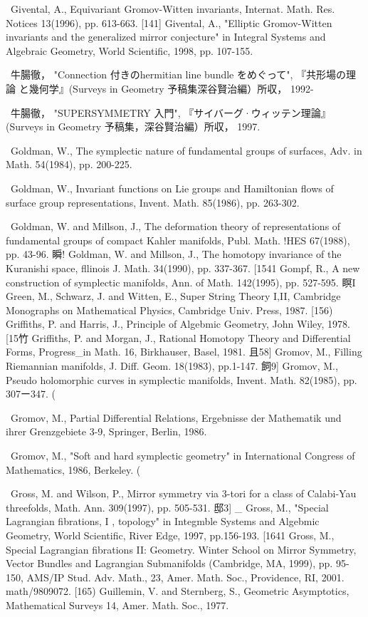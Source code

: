 {\noindent [146]\ Givental, A., Equivariant Gromov-Witten invariants, Internat. Math. Res. Notices 13(1996), pp. 613-663. [141] Givental, A., "Elliptic Gromov-Witten invariants and the generalized mirror conjecture" in Integral Systems and Algebraic Geometry, World Scientific, 1998, pp. 107-155.\par\smallskip
\noindent [148]\ 牛腸徹， "Connection 付きのhermitian line bundle をめぐって", 『共形場の理論 と幾何学』(Surveys in Geometry 予稿集深谷賢治編）所収， 1992-\par\smallskip
\noindent [149]\ 牛腸徹， "SUPERSYMMETRY 入門", 『サイバーグ·ウィッテン理論』(Surveys in Geometry 予稿集，深谷賢治編）所収， 1997.\par\smallskip
\noindent [150]\ Goldman, W., The symplectic nature of fundamental groups of surfaces, Adv. in Math. 54(1984), pp. 200-225.\par\smallskip
\noindent [151]\ Goldman, W., Invariant functions on Lie groups and Hamiltonian flows of surface group representations, Invent. Math. 85(1986), pp. 263-302.\par\smallskip
\noindent [152]\ Goldman, W. and Millson, J., The deformation theory of representations of fundamental groups of compact Kahler manifolds, Publ. Math. !HES 67(1988), pp. 43-96. 瞬! Goldman, W. and Millson, J., The homotopy invariance of the Kuranishi space, fllinois J. Math. 34(1990), pp. 337-367. [1541 Gompf, R., A new construction of symplectic manifolds, Ann. of Math. 142(1995), pp. 527-595. 瞑I Green, M., Schwarz, J. and Witten, E., Super String Theory I,II, Cambridge Monographs on Mathematical Physics, Cambridge Univ. Press, 1987. [156) Griffiths, P. and Harris, J., Principle of Algebmic Geometry, John Wiley, 1978. [15竹 Griffiths, P. and Morgan, J., Rational Homotopy Theory and Differential Forms, Progress\_in Math. 16, Birkhauser, Basel, 1981. 且58] Gromov, M., Filling Riemannian manifolds, J. Diff. Geom. 18(1983), pp.1-147. 飼9] Gromov, M., Pseudo holomorphic curves in symplectic manifolds, Invent. Math. 82(1985), pp. 307ー347. (\par\smallskip
\noindent [160]\ Gromov, M., Partial Differential Relations, Ergebnisse der Mathematik und ihrer Grenzgebiete 3-9, Springer, Berlin, 1986.\par\smallskip
\noindent [161]\ Gromov, M., "Soft and hard symplectic geometry" in International Congress of Mathematics, 1986, Berkeley. (\par\smallskip
\noindent [162]\ Gross, M. and Wilson, P., Mirror symmetry via 3-tori for a class of Calabi-Yau threefolds, Math. Ann. 309(1997), pp. 505-531. 邸3] \_ Gross, M., "Special Lagrangian fibrations, I , topology" in Integmble Systems and Algebmic Geometry, World Scientific, River Edge, 1997, pp.156-193. [1641 Gross, M., Special Lagrangian fibrations II: Geometry. Winter School on Mirror Symmetry, Vector Bundles and Lagrangian Submanifolds (Cambridge, MA, 1999), pp. 95-150, AMS/IP Stud. Adv. Math., 23, Amer. Math. Soc., Providence, RI, 2001. math/9809072. [165) Guillemin, V. and Sternberg, S., Geometric Asymptotics, Mathematical Surveys 14, Amer. Math. Soc., 1977.\par\smallskip
}
